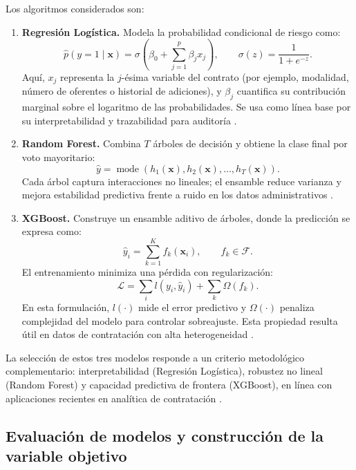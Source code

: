 Los algoritmos considerados son:

\begin{enumerate}
        \item \textbf{Regresión Logística.} Modela la probabilidad condicional de riesgo como:
        \[
            \hat{p}(y=1\mid \mathbf{x}) = \sigma\!\left(\beta_0 + \sum_{j=1}^{p} \beta_j x_j\right),
            \qquad \sigma(z)=\frac{1}{1+e^{-z}}.
        \]
        Aquí, $x_j$ representa la $j$-ésima variable del contrato (por ejemplo, modalidad, número de oferentes o historial de adiciones), y $\beta_j$ cuantifica su contribución marginal sobre el logaritmo de las probabilidades. Se usa como línea base por su interpretabilidad y trazabilidad para auditoría \cite{gallego2021preventing}.

        \item \textbf{Random Forest.} Combina $T$ árboles de decisión y obtiene la clase final por voto mayoritario:
        \[
            \hat{y} = \operatorname{mode}\left(h_1(\mathbf{x}), h_2(\mathbf{x}), \ldots, h_T(\mathbf{x})\right).
        \]
        Cada árbol captura interacciones no lineales; el ensamble reduce varianza y mejora estabilidad predictiva frente a ruido en los datos administrativos \cite{decarolis2022corruption, salazar2024vigia}.

        \item \textbf{XGBoost.} Construye un ensamble aditivo de árboles, donde la predicción se expresa como:
        \[
            \hat{y}_i = \sum_{k=1}^{K} f_k(\mathbf{x}_i), \qquad f_k \in \mathcal{F}.
        \]
        El entrenamiento minimiza una pérdida con regularización:
        \[
            \mathcal{L} = \sum_{i} l(y_i,\hat{y}_i) + \sum_{k}\Omega(f_k).
        \]
        En esta formulación, $l(\cdot)$ mide el error predictivo y $\Omega(\cdot)$ penaliza complejidad del modelo para controlar sobreajuste. Esta propiedad resulta útil en datos de contratación con alta heterogeneidad \cite{alshboul2022extreme, tas2024machine}.
\end{enumerate}

La selección de estos tres modelos responde a un criterio metodológico complementario: interpretabilidad (Regresión Logística), robustez no lineal (Random Forest) y capacidad predictiva de frontera (XGBoost), en línea con aplicaciones recientes en analítica de contratación \cite{salazar2024vigia, gallego2021preventing}.

\subsection{Evaluación de modelos y construcción de la variable objetivo}

